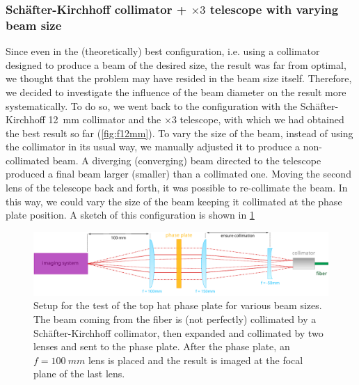 \subsubsection{Schäfter-Kirchhoff collimator + $\times 3$ telescope with varying beam size}

Since even in the (theoretically) best configuration, i.e. using a collimator designed to produce a beam of the desired size, the result was far from optimal, we thought that the problem may have resided in the beam size itself. Therefore, we decided to investigate the influence of the beam diameter on the result more systematically. To do so, we went back to the configuration with the Schäfter-Kirchhoff \SI{12}{mm} collimator and the $\times3$ telescope, with which we had obtained the best result so far (\cref{fig:f12mm}).
To vary the size of the beam, instead of using the collimator in its usual way, we manually adjusted it to produce a non-collimated beam. A diverging (converging) beam directed to the telescope produced a final beam larger (smaller) than a collimated one. Moving the second lens of the telescope back and forth, it was possible to re-collimate the beam. In this way, we could vary the size of the beam keeping it collimated at the phase plate  position. A sketch of this configuration is shown in \cref{fig:adjustable_setup}

\begin{figure}
    \includegraphics[width=\textwidth]{chapters/chapter_3/figures/adjfoc_setup.pdf}
    \caption{Setup for the test of the top hat phase plate for various beam sizes. The beam coming from the fiber is (not perfectly) collimated by a Schäfter-Kirchhoff collimator, then expanded and collimated by two lenses and sent to the phase plate. After the phase plate, an $f=\SI{100}{mm}$ lens is placed and the result is imaged at the focal plane of the last lens.}
    \label{fig:adjustable_setup}
\end{figure}

